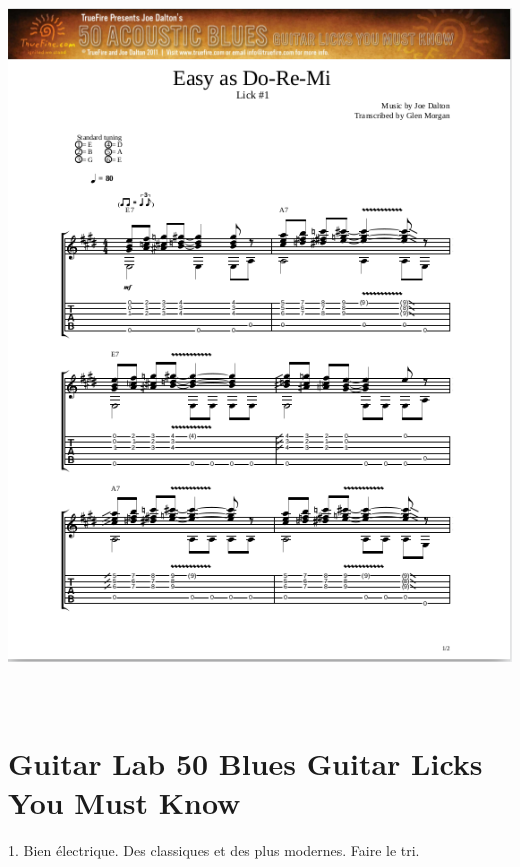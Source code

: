\documentclass[a4paper]{book}
\begin{document}
\begin{center}
\includegraphics[width=14.894cm,height=19.313cm]{lebluessupportsmethodes-img73.png}
\end{center}






\clearpage\section[Guitar Lab 50 Blues Guitar Licks You Must
Know]{Guitar Lab 50 Blues Guitar Licks You Must Know}
\hypertarget{RefHeadingToc142973218262}{}1. Bien \'electrique. Des
classiques et des plus modernes. Faire le tri.
\end{document}
